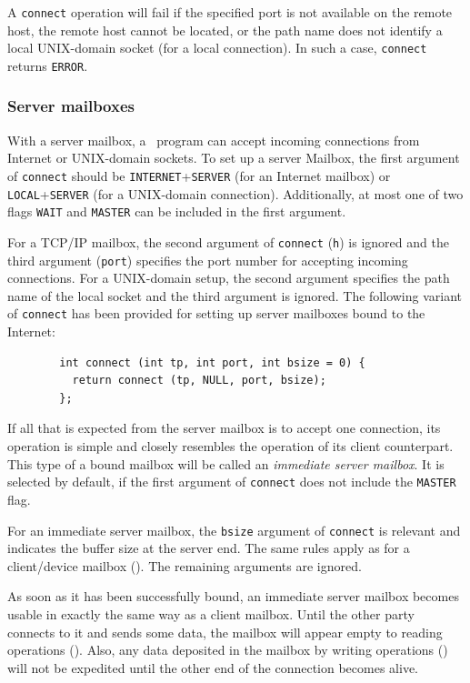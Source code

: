 \medskip

\noindent
A {\tt connect} operation
will fail if the specified port is not available on the remote host,
the remote host cannot be located, or the path name does not identify a local
UNIX-domain socket (for a local connection).
In such a case, {\tt connect} returns {\tt ERROR}.

\subsubsection{Server mailboxes}
\label{rm_mb_bo_se}

With a server mailbox, a \smurph\ program can accept incoming connections
from Internet or UNIX-domain sockets.
To set up a server Mailbox, the first argument of {\tt connect} should be
{\tt INTERNET}+{\tt SERVER} (for an Internet mailbox) or
{\tt LOCAL}+{\tt SERVER} (for a UNIX-domain connection).
Additionally, at most one of two flags {\tt WAIT} and {\tt MASTER}
can be included in the first argument.

For a TCP/IP mailbox,
the second argument of {\tt connect} ({\tt h}) is ignored and the third
argument ({\tt port}) specifies the port number for accepting incoming
connections.
For a UNIX-domain setup, the second argument specifies the path name of
the local socket and the third argument is ignored.
The following variant of {\tt connect} has been provided for setting up
server mailboxes bound to the Internet:
\begin{verbatim}
        int connect (int tp, int port, int bsize = 0) {
          return connect (tp, NULL, port, bsize);
        };
\end{verbatim}

If all that is expected from the server mailbox is to accept one connection,
its operation is simple and closely resembles the operation of its
client counterpart.
This type of a bound mailbox will be called an {\em immediate server mailbox}.
It is selected by default, if the first argument of {\tt connect}
does not include the {\tt MASTER} flag.

For an immediate server mailbox, the {\tt bsize} argument of {\tt connect}
is relevant and indicates the buffer size at the server end.
The same rules apply as for a client/device mailbox
().
The remaining arguments are ignored.

As soon as it has been successfully bound, an immediate server mailbox
becomes usable in exactly the same way as a client mailbox.
Until the other party connects to it and sends some data, the mailbox
will appear empty to reading operations ().
Also, any data deposited in the mailbox by writing operations
() will not be expedited until the other end of the
connection becomes alive.

